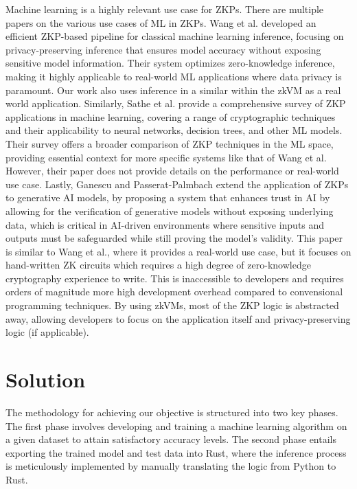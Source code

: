 \documentclass{scrartcl}
\begin{document}
Machine learning is a highly relevant use case for ZKPs. There are multiple papers on the various use cases of ML in ZKPs. Wang et al.\cite{wang2024efficient} developed an efficient ZKP-based pipeline for classical machine learning inference, focusing on privacy-preserving inference that ensures model accuracy without exposing sensitive model information. Their system optimizes zero-knowledge inference, making it highly applicable to real-world ML applications where data privacy is paramount. Our work also uses inference in a similar within the zkVM as a real world application. Similarly, Sathe et al.\cite{sathe2024survey} provide a comprehensive survey of ZKP applications in machine learning, covering a range of cryptographic techniques and their applicability to neural networks, decision trees, and other ML models. Their survey offers a broader comparison of ZKP techniques in the ML space, providing essential context for more specific systems like that of Wang et al. However, their paper does not provide details on the performance or real-world use case. Lastly, Ganescu and Passerat-Palmbach\cite{ganescu2024trust} extend the application of ZKPs to generative AI models, by proposing a system that enhances trust in AI by allowing for the verification of generative models without exposing underlying data, which is critical in AI-driven environments where sensitive inputs and outputs must be safeguarded while still proving the model’s validity. This paper is similar to Wang et al., where it provides a real-world use case, but it focuses on hand-written ZK circuits which requires a high degree of zero-knowledge cryptography experience to write. This is inaccessible to developers and requires orders of magnitude more high development overhead compared to convensional programming techniques. By using zkVMs, most of the ZKP logic is abstracted away, allowing developers to focus on the application itself and privacy-preserving logic (if applicable).

\section{Solution}

The methodology for achieving our objective is structured into two key phases. The first phase involves developing and training a machine learning algorithm on a given dataset to attain satisfactory accuracy levels. The second phase entails exporting the trained model and test data into Rust, where the inference process is meticulously implemented by manually translating the logic from Python to Rust.
\end{document}
